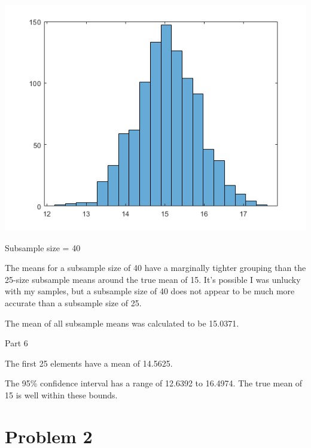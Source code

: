 \documentclass[a4paper]{article}
\begin{document}
\begin{center}
    \includegraphics[scale=1]{meansHistogram40.png}
    \caption{Subsample size = 40}
\end{center}

\noindent 
The means for a subsample size of 40 have a marginally tighter grouping than the 25-size subsample means around the true mean of 15. It's possible I was unlucky with my samples, but a subsample size of 40 does not appear to be much more accurate than a subsample size of 25.

\noindent
The mean of all subsample means was calculated to be 15.0371.

\bigskip
\noindent
Part 6

\noindent
The first 25 elements have a mean of 14.5625.

\smallskip
\noindent
The 95\% confidence interval has a range of 12.6392 to 16.4974. The true mean of 15 is well within these bounds.

\section{Problem 2}
\end{document}
